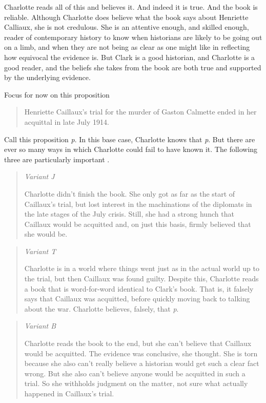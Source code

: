 \documentclass[
  11pt,
]{book}
\begin{document}
Charlotte reads all of this and believes it. And indeed it is true. And the book is reliable. Although Charlotte does believe what the book says about Henriette Calliaux, she is not credulous. She is an attentive enough, and skilled enough, reader of contemporary history to know when historians are likely to be going out on a limb, and when they are not being as clear as one might like in reflecting how equivocal the evidence is. But Clark is a good historian, and Charlotte is a good reader, and the beliefs she takes from the book are both true and supported by the underlying evidence.

Focus for now on this proposition

\begin{quote}
Henriette Caillaux's trial for the murder of Gaston Calmette ended in her acquittal in late July 1914.
\end{quote}

Call this proposition \emph{p}. In this base case, Charlotte knows that \emph{p}. But there are ever so many ways in which Charlotte could fail to have known it. The following three are particularly important .

\begin{quote}
\emph{Variant J}

Charlotte didn't finish the book. She only got as far as the start of Caillaux's trial, but lost interest in the machinations of the diplomats in the late stages of the July crisis. Still, she had a strong hunch that Caillaux would be acquitted and, on just this basis, firmly believed that she would be.
\end{quote}

\begin{quote}
\emph{Variant T}

Charlotte is in a world where things went just as in the actual world up to the trial, but then Caillaux was found guilty. Despite this, Charlotte reads a book that is word-for-word identical to Clark's book. That is, it falsely says that Caillaux was acquitted, before quickly moving back to talking about the war. Charlotte believes, falsely, that \emph{p}.
\end{quote}

\begin{quote}
\emph{Variant B}

Charlotte reads the book to the end, but she can't believe that Caillaux would be acquitted. The evidence was conclusive, she thought. She is torn because she also can't really believe a historian would get such a clear fact wrong. But she also can't believe anyone would be acquitted in such a trial. So she withholds judgment on the matter, not sure what actually happened in Caillaux's trial.
\end{quote}
\end{document}
